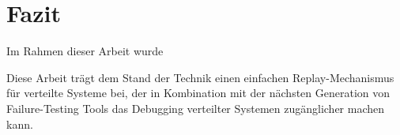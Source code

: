 \documentclass[12pt,a4paper]{report}
\begin{document}




\chapter{Fazit}
Im Rahmen dieser Arbeit wurde 

Diese Arbeit trägt dem Stand der Technik einen einfachen Replay-Mechanismus für verteilte Systeme bei, der in Kombination mit
der nächsten Generation von Failure-Testing Tools das Debugging verteilter Systemen zugänglicher machen kann.

\printbibliography
\end{document}

